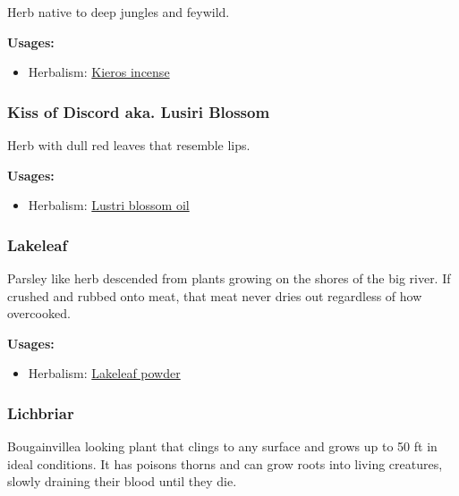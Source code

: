 Herb native to deep jungles and feywild.

\vspace{5mm}

\textbf{Usages:}

\begin{itemize}[noitemsep]
\item[] Herbalism: \hyperref[Kieros incense]{Kieros incense}
\end{itemize}

\subsubsection{Kiss of Discord aka. Lusiri Blossom}
\label{Kiss of Discord}

Herb with dull red leaves that resemble lips.

\vspace{5mm}

\textbf{Usages:}

\begin{itemize}[noitemsep]
\item[] Herbalism: \hyperref[Lustri blossom oil]{Lustri blossom oil}
\end{itemize}

\subsubsection{Lakeleaf}
\label{Lakeleaf}

Parsley like herb descended from plants growing on the shores of the big river. If crushed and rubbed onto meat, that meat never dries out regardless of how overcooked.

\vspace{5mm}

\textbf{Usages:}

\begin{itemize}[noitemsep]
\item[] Herbalism: \hyperref[Lakeleaf powder]{Lakeleaf powder}
\end{itemize}

\subsubsection{Lichbriar}
\label{Lichbriar}

Bougainvillea looking plant that clings to any surface and grows up to 50 ft in ideal conditions. It has poisons thorns and can grow roots into living creatures, slowly draining their blood until they die. 

